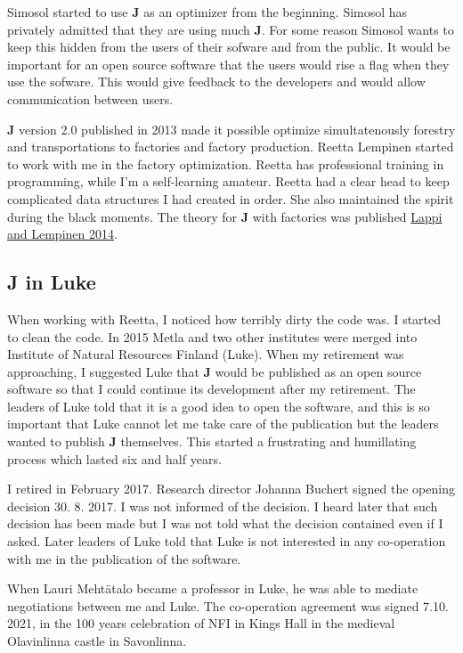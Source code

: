 Simosol started to use \textbf{J} as an 
optimizer from the beginning. Simosol has privately admitted 
that they are using much \textbf{J}. 
For some reason Simosol 
wants to keep this hidden from the users of their sofware and from the public. 
It would be important for an open source software that 
the users would rise a flag when they use the sofware. 
This would give feedback to the developers 
and would allow communication between users. 
 
\textbf{J} version 2.0 published in 2013 made it possible optimize simultatenously 
forestry and transportations to factories 
and factory production. 
Reetta Lempinen started to work with me in the factory optimization. 
Reetta has professional 
training in programming, while I'm a self-learning amateur. 
Reetta had a clear head to keep complicated data structures I had created in order. 
She also maintained the spirit during the black moments. The theory for \textbf{J} with factories was published 
\href{run:./lappilempinen.pdf}{Lappi and Lempinen 2014}. 
 
 
\subsection*{J in Luke} 
When working with Reetta, I noticed how terribly dirty the code was. I started to clean the 
code. 
In 2015 Metla and 
two other institutes were merged into Institute of Natural Resources Finland (Luke). 
When my retirement was approaching, I suggested Luke that \textbf{J} would be published as 
an open source software so that I could continue its development after my retirement. 
The leaders of Luke told that it is a good idea to open the software, and this is so important that 
Luke cannot let me take care of the publication but the leaders wanted to publish \textbf{J} 
themselves. This started a frustrating and humillating process which lasted six and half years. 
 
I retired in February 2017.  Research director Johanna Buchert signed the opening decision 30. 8. 2017. 
I was not informed of the decision. I heard later that such decision has been made but 
I was not told what the decision contained even if I asked. Later leaders of Luke told 
that Luke is not interested in any co-operation with me in the publication of the software. 
 
When Lauri Mehtätalo became a professor in Luke, he was able to mediate negotiations between me and Luke. 
The co-operation agreement was signed 7.10. 2021, in the 100 years celebration of NFI in  Kings Hall 
in the medieval Olavinlinna castle in Savonlinna. 
 
